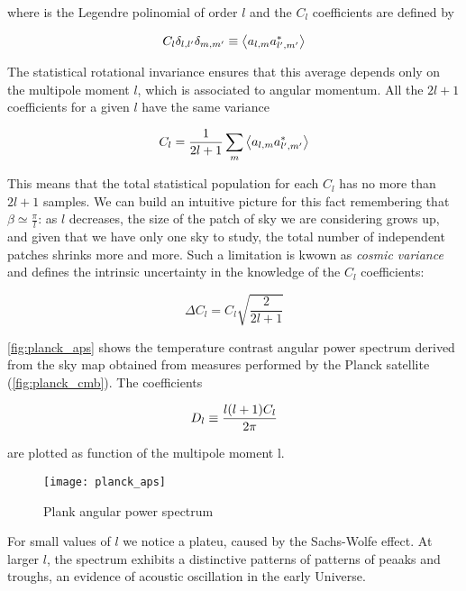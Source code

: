 where is the Legendre polinomial of order $l$ and the $C_l$ coefficients
are defined by

\begin{equation}
        C_l \delta_{l,l'} \delta_{m,m'} \equiv \expval{a_{l,m} a^*_{l',m'}}
\end{equation}

The statistical rotational
invariance ensures that this average depends only on the multipole moment
$l$, which is associated to angular momentum. All the $2l + 1$ coefficients
for a given $l$ have the same variance

\begin{equation}
        C_l = \frac{1}{2l + 1} \sum_m \expval{a_{l,m} a^*_{l',m'}}
\end{equation}

This means that the total statistical population for each $C_l$ has no more
than $2l + 1$ samples. We can build an intuitive picture for this fact
remembering that $\beta \simeq \frac{\pi}{l}$: as $l$ decreases, the size of
the patch of sky we are considering grows up, and given that we have only
one sky to study, the total number of independent patches shrinks more and
more. Such a limitation is kwown as \emph{cosmic variance} and defines the
intrinsic uncertainty in the knowledge of the $C_l$ coefficients:

\begin{equation}
        \Delta C_l = C_l \sqrt{\frac{2}{2l + 1}}
\end{equation}

\autoref{fig:planck_aps} shows the temperature contrast angular power
spectrum derived from the sky map obtained from measures performed by the
Planck satellite (\autoref{fig:planck_cmb}). The coefficients

\begin{equation}
        D_l \equiv \frac{l\qty(l + 1)C_l}{2\pi}
\end{equation}

are plotted as function of the multipole moment l.

\begin{figure}
        \centering
        \texttt{[image: planck\_aps]}
        \caption{Plank angular power spectrum}
        \label{fig:planck_aps}
\end{figure}

For small values of $l$ we notice a plateu, caused by the Sachs-Wolfe
effect. At larger $l$, the spectrum exhibits a distinctive patterns of
patterns of peaaks and troughs, an evidence of acoustic oscillation in the
early Universe.

